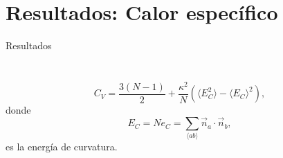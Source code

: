 \documentclass[xcolor=dvipsnames]{beamer}
\begin{document}
\section{Resultados: Calor específico}
\begin{frame}{Resultados}
\begin{columns}
  \begin{column}{5.8cm}
    \begin{figure}[h]
      \centering
      \resizebox{\columnwidth}{!}{}
    \end{figure}
  \end{column}
  \begin{column}{5.8cm}
    \begin{figure}[h]
      \centering
     \resizebox{\columnwidth}{!}{ }
    \end{figure}
  \end{column}
\end{columns}
\begin{equation*}
 C_V=\frac{3(N-1)}{2}+\frac{\kappa^2}{N}(\langle E_C^2 \rangle-\langle E_C
\rangle^2),
\end{equation*}
donde
\begin{equation*}
E_C=Ne_C=\sum_{\langle ab \rangle}\vec{n}_a\cdot\vec{n}_b, 
\end{equation*}
es la energía de curvatura.
\end{frame}
\end{document}
